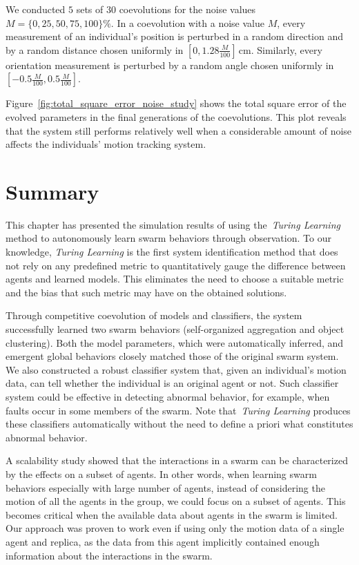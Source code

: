 We conducted $5$ sets of $30$ coevolutions for the noise values $M=\{0, 25, 50, 75, 100\}\%$. In a coevolution with a noise value $M$, every measurement of an individual's position is perturbed in a random direction and by a random distance chosen uniformly in $\left[0, 1.28\frac{M}{100}\right] \,\textrm{cm}$. Similarly, every orientation measurement is perturbed by a random angle chosen uniformly in $\left[-0.5\frac{M}{100}, 0.5\frac{M}{100}\right]$.

Figure~\ref{fig:total_square_error_noise_study} shows the total square error of the evolved parameters in the final generations of the coevolutions. This plot reveals that the system still performs relatively well when a considerable amount of noise affects the individuals' motion tracking system.

\section{Summary}\label{sec:summary_simulation_swarm}

This chapter has presented the simulation results of using the~\textit{Turing Learning} method to autonomously learn swarm behaviors through observation. To our knowledge, \textit{Turing Learning} is the first system identification method that does not rely on any predefined metric to quantitatively gauge the difference between agents and learned models. This eliminates the need to choose a suitable metric and the bias that such metric may have on the obtained solutions. 

Through competitive coevolution of models and classifiers, the system successfully learned two swarm behaviors (self-organized aggregation and object clustering). Both the model parameters, which were automatically inferred, and emergent global behaviors closely matched those of the original swarm system. We also constructed a robust classifier system that, given an individual's motion data, can tell whether the individual is an original agent or not. Such classifier system could be effective in detecting abnormal behavior, for example, when faults occur in some members of the swarm. Note that~\textit{Turing Learning} produces these classifiers automatically without the need to define a priori what constitutes abnormal behavior. 

A scalability study showed that the interactions in a swarm can be characterized by the effects on a subset of agents. In other words, when learning swarm behaviors especially with large number of agents, instead of considering the motion of all the agents in the group, we could focus on a subset of agents. This becomes critical when the available data about agents in the swarm is limited. Our approach was proven to work even if using only the motion data of a single agent and replica, as the data from this agent implicitly contained enough information about the interactions in the swarm.   

